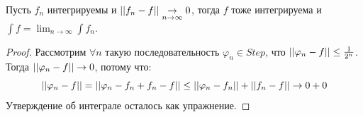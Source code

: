 \begin{lemma*}
    Пусть $f_n$ интегрируемы и $\left| \left|  f_n - f \right| \right| \underset{n \to \infty}{\to} 0$, тогда $f$ тоже интегрируема и $\int f = \lim_{n \to \infty} \int f_n$.
    \begin{proof}
        Рассмотрим $\forall n$ такую последовательность $\varphi_n \in Step$, что $\left| \left|  \varphi_n - f \right| \right| \le \frac{1}{2^n}$.
        Тогда $\left| \left|  \varphi_n - f \right| \right| \to 0$, потому что:
        \[\left| \left|  \varphi_n -f \right| \right| = \left| \left|  \varphi_n - f_n + f_n - f \right| \right| \le \left| \left|  \varphi_n - f_n \right| \right| + \left| \left|  f_n - f \right| \right| \to 0 + 0\]
        Утверждение об интеграле осталось как упражнение.
    \end{proof}
\end{lemma*}